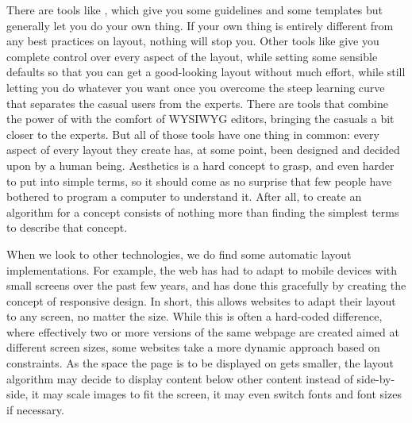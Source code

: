    There are tools like \ppt, which give you some guidelines and some templates
   but generally let you do your own thing. If your own thing is entirely
   different from any best practices on layout, nothing will stop you. Other
   tools like \latex give you complete control over every aspect of the layout,
   while setting some sensible defaults so that you can get a good-looking
   layout without much effort, while still letting you do whatever you want
   once you overcome the steep learning curve that separates the casual users
   from the experts. There are tools that combine the power of \latex with the
   comfort of WYSIWYG editors, bringing the casuals a bit closer to the
   experts. But all of those tools have one thing in common: every aspect of
   every layout they create has, at some point, been designed and decided upon
   by a human being. Aesthetics is a hard concept to grasp, and even harder to
   put into simple terms, so it should come as no surprise that few people have
   bothered to program a computer to understand it. After all, to create an
   algorithm for a concept consists of nothing more than finding the simplest
   terms to describe that concept.

   When we look to other technologies, we do find some automatic layout
   implementations. For example, the web has had to adapt to mobile devices
   with small screens over the past few years, and has done this gracefully by
   creating the concept of responsive design. In short, this allows websites to
   adapt their layout to any screen, no matter the size. While this is often a
   hard-coded difference, where effectively two or more versions of the same
   webpage are created aimed at different screen sizes, some websites take a
   more dynamic approach based on constraints. As the space the page is to be
   displayed on gets smaller, the layout algorithm may decide to display
   content below other content instead of side-by-side, it may scale images to
   fit the screen, it may even switch fonts and font sizes if necessary.

